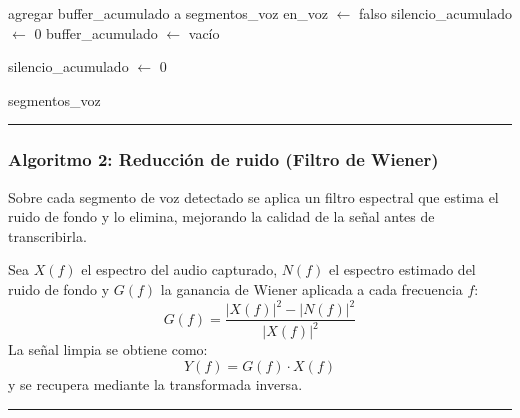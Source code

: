 \begin{algorithmic}[1]

                \State agregar buffer\_acumulado a segmentos\_voz
                \State en\_voz             $\gets$ falso
                \State silencio\_acumulado $\gets$ 0
                \State buffer\_acumulado   $\gets$ vacío

            \EndIf

        \Else

            \State silencio\_acumulado $\gets$ 0 

        \EndIf
\Statex
    \EndIf
\Statex
\EndFor
\Statex
\State \Return segmentos\_voz

\end{algorithmic}
\vspace{-0.9cm}
\rule{\textwidth}{0.4pt}

\subsubsection{Algoritmo 2: Reducción de ruido (Filtro de Wiener)}
\label{apend:wiener}
Sobre cada segmento de voz detectado se aplica un filtro espectral que estima el ruido
de fondo y lo elimina, mejorando la calidad de la señal antes de transcribirla.

Sea $X(f)$ el espectro del audio capturado, $N(f)$ el espectro estimado del ruido de
fondo y $G(f)$ la ganancia de Wiener aplicada a cada frecuencia $f$:
\[
G(f) = \frac{|X(f)|^2 - |N(f)|^2}{|X(f)|^2}
\]
La señal limpia se obtiene como:
\[
Y(f) = G(f) \cdot X(f)
\]
y se recupera mediante la transformada inversa.

\begin{center}
\label{alg:rudio}
\end{center}
\vspace{-1.8cm}
\rule{\textwidth}{0.4pt}
\vspace{-0.9cm}

